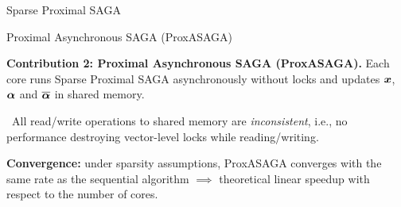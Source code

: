 \documentclass[10pt]{beamer}
\let\oldparencite=\parencite
\renewcommand{\parencite}[1]{\textcolor[rgb]{.7,.7,.7}{\oldparencite{#1}}}
\begin{document}
\begin{frame}{Sparse Proximal SAGA}




 
%  
\end{frame}


\begin{frame}{Proximal Asynchronous SAGA (ProxASAGA)}

{\bfseries Contribution 2: Proximal Asynchronous SAGA (ProxASAGA).} Each core
 runs Sparse Proximal SAGA asynchronously without locks and updates ${\boldsymbol x}$, ${\boldsymbol \alpha}$ and $\overline{{\boldsymbol \alpha}}$ in shared memory.

\vspace{0.5em} \faRandom~All read/write operations to shared memory are \emph{inconsistent}, i.e., no performance destroying vector-level locks while reading/writing.

{\bfseries Convergence:} under sparsity assumptions, ProxASAGA converges with the same rate as the sequential algorithm $\implies$ theoretical linear speedup with respect to the number of cores.
\end{frame}
\end{document}
